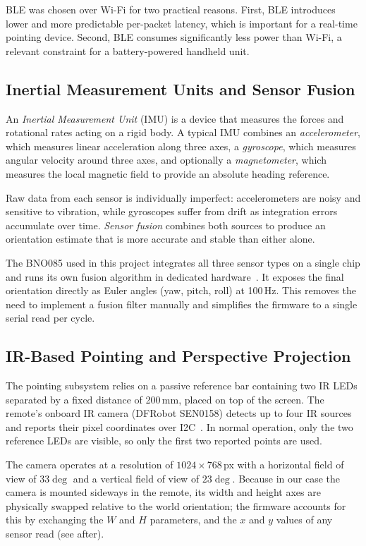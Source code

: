 \documentclass[12pt, a4paper]{article}
\begin{document}
BLE was chosen over Wi-Fi for two practical reasons. First, BLE introduces lower and more predictable per-packet latency, which is important for a real-time pointing device. Second, BLE consumes significantly less power than Wi-Fi, a relevant constraint for a battery-powered handheld unit.

\subsection{Inertial Measurement Units and Sensor Fusion}

An \textit{Inertial Measurement Unit} (IMU) is a device that measures the forces and rotational rates acting on a rigid body. A typical IMU combines an \textit{accelerometer}, which measures linear acceleration along three axes, a \textit{gyroscope}, which measures angular velocity around three axes, and optionally a \textit{magnetometer}, which measures the local magnetic field to provide an absolute heading reference.

Raw data from each sensor is individually imperfect: accelerometers are noisy and sensitive to vibration, while gyroscopes suffer from drift as integration errors accumulate over time. \textit{Sensor fusion} combines both sources to produce an orientation estimate that is more accurate and stable than either alone.

The BNO085 used in this project integrates all three sensor types on a single chip and runs its own fusion algorithm in dedicated hardware~\cite{bno085}. It exposes the final orientation directly as Euler angles (yaw, pitch, roll) at 100\,Hz. This removes the need to implement a fusion filter manually and simplifies the firmware to a single serial read per cycle.

\subsection{IR-Based Pointing and Perspective Projection}

The pointing subsystem relies on a passive reference bar containing two IR LEDs separated by a fixed distance of 200\,mm, placed on top of the screen. The remote's onboard IR camera (DFRobot SEN0158) detects up to four IR sources and reports their pixel coordinates over I2C~\cite{ir_camera}. In normal operation, only the two reference LEDs are visible, so only the first two reported points are used.

The camera operates at a resolution of $1024 \times 768$\,px with a horizontal field of view of $33\deg$ and a vertical field of view of $23\deg$. Because in our case the camera is mounted sideways in the remote, its width and height axes are physically swapped relative to the world orientation; the firmware accounts for this by exchanging the $W$ and $H$ parameters, and the $x$ and $y$ values of any sensor read (see after).
\end{document}

